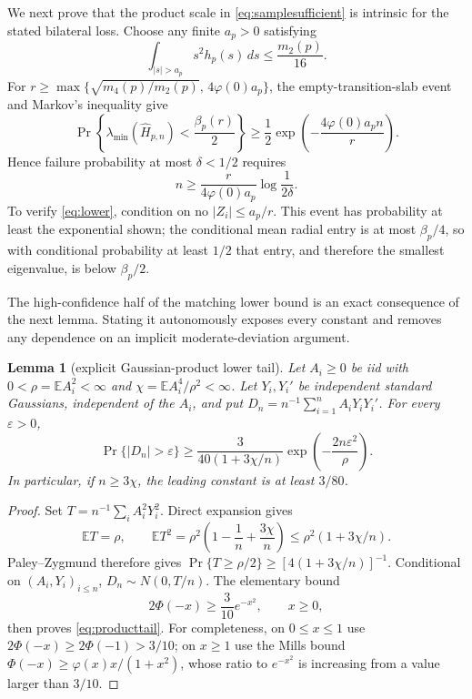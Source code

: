 \documentclass[11pt]{article}
\newtheorem{lemma}[theorem]{Lemma}
\newcommand{\E}{\mathbb E}
\begin{document}
We next prove that the product scale in \eqref{eq:samplesufficient} is intrinsic for the stated bilateral loss.
Choose any finite $a_p>0$ satisfying
\[
 \int_{|s|>a_p}s^2h_p(s)\,ds\le\frac{m_2(p)}{16}.
\]
For
$r\ge\max\{\sqrt{m_4(p)/m_2(p)},\,4\varphi(0)a_p\}$, the empty-transition-slab event and Markov's inequality give
\begin{equation}
 \Pr\!\left\{\lambda_{\min}(\widehat H_{p,n})<\frac{\beta_p(r)}2\right\}
 \ge\frac12\exp\!\left(-\frac{4\varphi(0)a_pn}{r}\right).
 \label{eq:lower}
\end{equation}
Hence failure probability at most $\delta<1/2$ requires
\begin{equation}
 n\ge\frac{r}{4\varphi(0)a_p}\log\frac1{2\delta}.
 \label{eq:lowern}
\end{equation}
To verify \eqref{eq:lower}, condition on no $|Z_i|\le a_p/r$.  This event has probability at least the exponential
shown; the conditional mean radial entry is at most $\beta_p/4$, so with conditional probability at least $1/2$
that entry, and therefore the smallest eigenvalue, is below $\beta_p/2$.

The high-confidence half of the matching lower bound is an exact consequence of the next lemma.  Stating it
autonomously exposes every constant and removes any dependence on an implicit moderate-deviation argument.

\begin{lemma}[explicit Gaussian-product lower tail]
\label{lem:gaussianproducttail}
Let $A_i\ge0$ be iid with $0<\rho=\E A_i^2<\infty$ and
$\chi=\E A_i^4/\rho^2<\infty$.  Let $Y_i,Y_i'$ be independent standard Gaussians, independent of the $A_i$, and
put $D_n=n^{-1}\sum_{i=1}^nA_iY_iY_i'$.  For every $\varepsilon>0$,
\begin{equation}
 \Pr\{|D_n|>\varepsilon\}
 \ge \frac{3}{40(1+3\chi/n)}
 \exp\!\left(-\frac{2n\varepsilon^2}{\rho}\right).
 \label{eq:producttail}
\end{equation}
In particular, if $n\ge3\chi$, the leading constant is at least $3/80$.
\end{lemma}

\begin{proof}
Set $T=n^{-1}\sum_iA_i^2Y_i^2$.  Direct expansion gives
\[
 \E T=\rho,
 \qquad
 \E T^2=\rho^2\left(1-\frac1n+\frac{3\chi}{n}\right)
 \le\rho^2(1+3\chi/n).
\]
Paley--Zygmund therefore gives
$\Pr\{T\ge\rho/2\}\ge[4(1+3\chi/n)]^{-1}$.  Conditional on $(A_i,Y_i)_{i\le n}$,
$D_n\sim N(0,T/n)$.  The elementary bound
\begin{equation}
 2\Phi(-x)\ge\frac3{10}e^{-x^2},\qquad x\ge0,
 \label{eq:elementarygaussianlower}
\end{equation}
then proves \eqref{eq:producttail}.  For completeness, on $0\le x\le1$ use
$2\Phi(-x)\ge2\Phi(-1)>3/10$; on $x\ge1$ use the Mills bound
$\Phi(-x)\ge\varphi(x)x/(1+x^2)$, whose ratio to $e^{-x^2}$ is increasing from a value larger than $3/10$.
\end{proof}
\end{document}
